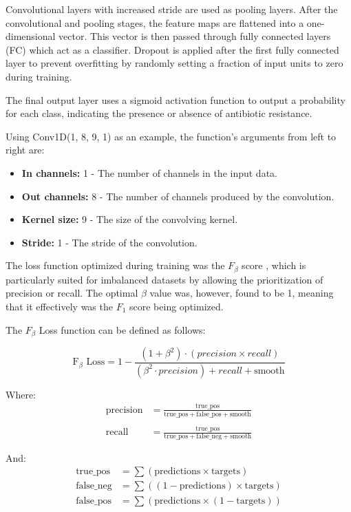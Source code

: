 \documentclass[english,11pt,a4paper,titlepage]{article}
\begin{document}
	Convolutional layers with increased stride are used as pooling layers. After the convolutional and pooling stages, the feature maps are flattened into a one-dimensional vector. This vector is then passed through fully connected layers (FC) which act as a classifier. Dropout is applied after the first fully connected layer to prevent overfitting by randomly setting a fraction of input units to zero during training.
	
	The final output layer uses a sigmoid activation function to output a probability for each class, indicating the presence or absence of antibiotic resistance.
	
	Using Conv1D(1, 8, 9, 1) as an example, the function's arguments from left to right are:
	\begin{itemize}
		\item \textbf{In channels:} 1 - The number of channels in the input data.
		\item \textbf{Out channels:} 8 - The number of channels produced by the convolution.
		\item \textbf{Kernel size:} 9 - The size of the convolving kernel.
		\item \textbf{Stride:} 1 - The stride of the convolution. 
	\end{itemize}
	
 	The loss function optimized during training was the \( F_{\beta} \) score \cite{leeSurrogateLossFunction2021}, which is particularly suited for imbalanced datasets by allowing the prioritization of precision or recall. The optimal \( \beta \) value was, however, found to be 1, meaning that it effectively was the \( F_1 \) score being optimized.
	
	The \( F_\beta \) Loss function can be defined as follows:
	
	\begin{equation*}
		\text{F}_\beta \text{ Loss} = 1 - \frac{(1 + \beta^2) \cdot (precision \times recall)}{(\beta^2 \cdot precision) + recall + \text{smooth}}
	\end{equation*}
	
	Where:
	\begin{align*}
		\text{precision} &= \frac{\text{true\_pos}}{\text{true\_pos} + \text{false\_pos} + \text{smooth}} \\
		\\
		\text{recall} &= \frac{\text{true\_pos}}{\text{true\_pos} + \text{false\_neg} + \text{smooth}}
	\end{align*}
	
	And:
	\begin{align*}
		\text{true\_pos} &= \sum(\text{predictions} \times \text{targets}) \\
		\text{false\_neg} &= \sum((1 - \text{predictions}) \times \text{targets}) \\
		\text{false\_pos} &= \sum(\text{predictions} \times (1 - \text{targets}))
	\end{align*}
	
\end{document}
